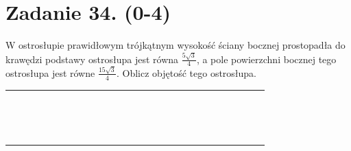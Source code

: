 \documentclass[10pt]{article}
\begin{document}
\section*{Zadanie 34. (0-4)}
W ostrosłupie prawidłowym trójkątnym wysokość ściany bocznej prostopadła do krawędzi podstawy ostrosłupa jest równa \(\frac{5 \sqrt{3}}{4}\), a pole powierzchni bocznej tego ostrosłupa jest równe \(\frac{15 \sqrt{3}}{4}\). Oblicz objętość tego ostrosłupa.

\begin{center}
\begin{tabular}{|c|c|c|c|c|c|c|c|c|c|c|c|c|c|c|c|c|c|c|c|c|c|c|c|c|c|c|}
\hline
 &  &  &  &  &  &  &  &  &  &  &  &  &  &  &  &  &  &  &  &  &  &  &  &  &  &  \\
\hline
 &  &  &  &  &  &  &  &  &  &  &  &  &  &  &  &  &  &  &  &  &  &  &  &  &  &  \\
\hline
 &  &  &  &  &  &  &  &  &  &  &  &  &  &  &  &  &  &  &  &  &  &  &  &  &  &  \\
\hline
 &  &  &  &  &  &  &  &  &  &  &  &  &  &  &  &  &  &  &  &  &  &  &  &  &  &  \\
\hline
 &  &  &  &  &  &  &  &  &  &  &  &  &  &  &  &  &  &  &  &  &  &  &  &  &  &  \\
\hline
 &  &  &  &  &  &  &  &  &  &  &  &  &  &  &  &  &  &  &  &  &  &  &  &  &  &  \\
\hline
 &  &  &  &  &  &  &  &  &  &  &  &  &  &  &  &  &  &  &  &  &  &  &  &  &  &  \\
\hline
 &  &  &  &  &  &  &  &  &  &  &  &  &  &  &  &  &  &  &  &  &  &  &  &  &  &  \\
\hline
 &  &  &  &  &  &  &  &  &  &  &  &  &  &  &  &  &  &  &  &  &  &  &  &  &  &  \\
\hline
 &  &  &  &  &  &  &  &  &  &  &  &  &  &  &  &  &  &  &  &  &  &  &  &  &  &  \\
\hline
 &  &  &  &  &  &  &  &  &  &  &  &  &  &  &  &  &  &  &  &  &  &  &  &  &  &  \\
\hline
 &  &  &  &  &  &  &  &  &  &  &  &  &  &  &  &  &  &  &  &  &  &  &  &  &  &  \\
\hline
 &  &  &  &  &  &  &  &  &  &  &  &  &  &  &  &  &  &  &  &  &  &  &  &  &  &  \\
\hline
 &  &  &  &  &  &  &  &  &  &  &  &  &  &  &  &  &  &  &  &  &  &  &  &  &  &  \\
\hline
 &  &  &  &  &  &  &  &  &  &  &  &  &  &  &  &  &  &  &  &  &  &  &  &  &  &  \\
\hline
 &  &  &  &  &  &  &  &  &  &  &  &  &  &  &  &  &  &  &  &  &  &  &  &  &  &  \\

\end{tabular}
\end{center}
\end{document}
